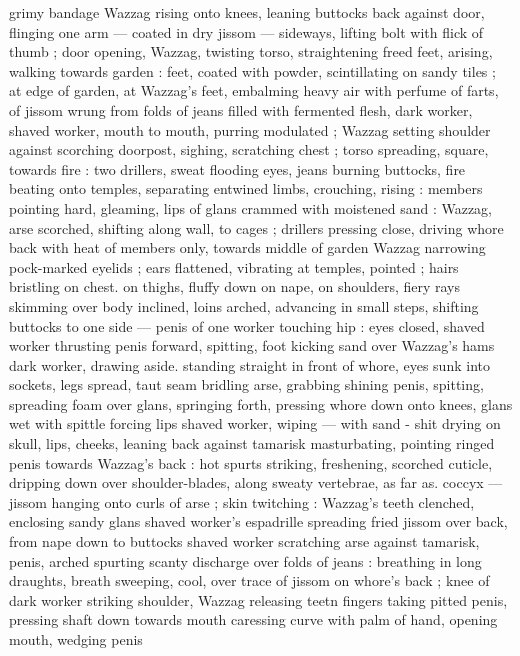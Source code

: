 grimy bandage {\semislash} Wazzag rising onto knees, leaning buttocks back 
against door, flinging one arm --- coated in dry jissom --- sideways, 
lifting bolt with flick of thumb ; door opening, Wazzag, twisting torso, 
straightening freed feet, arising, walking towards garden : feet, 
coated with powder, scintillating on sandy tiles ; at edge of garden, 
at Wazzag's feet, embalming heavy air with perfume of farts, of 
jissom wrung from folds of jeans filled with fermented flesh, dark 
worker, shaved worker, mouth to mouth, purring modulated ; Wazzag 
setting shoulder against scorching doorpost, sighing, scratching 
chest ; torso spreading, square, towards fire : two drillers, sweat 
flooding eyes, jeans burning buttocks, fire beating onto temples, 
separating entwined limbs, crouching, rising : members pointing 
hard, gleaming, lips of glans crammed with moistened sand : 
Wazzag, arse scorched, shifting along wall, to cages ; drillers 
pressing close, driving whore back with heat of members only, 
towards middle of garden {\col} Wazzag narrowing pock-marked eyelids ; 
ears flattened, vibrating at temples, pointed ; hairs bristling on chest. 
on thighs, fluffy down on nape, on shoulders, fiery rays skimming 
over body inclined, loins arched, advancing in small steps, shifting 
buttocks to one side --- penis of one worker touching hip : eyes 
closed, shaved worker thrusting penis forward, spitting, foot kicking 
sand over Wazzag's hams {\col} dark worker, drawing aside. standing 
straight in front of whore, eyes sunk into sockets, legs spread, taut 
seam bridling arse, grabbing shining penis, spitting, spreading foam 
over glans, springing forth, pressing whore down onto knees, glans 
wet with spittle forcing lips {\col} shaved worker, wiping --- with sand - 
shit drying on skull, lips, cheeks, leaning back against tamarisk 
masturbating, pointing ringed penis towards Wazzag's back : hot 
spurts striking, freshening, scorched cuticle, dripping down over 
shoulder-blades, along sweaty vertebrae, as far as. coccyx --- jissom 
hanging onto curls of arse ; skin twitching : Wazzag's teeth 
clenched, enclosing sandy glans {\col} shaved worker's espadrille 
spreading fried jissom over back, from nape down to buttocks 
shaved worker scratching arse against tamarisk, penis, arched 
spurting scanty discharge over folds of jeans : breathing in long 
draughts, breath sweeping, cool, over trace of jissom on whore's 
back ; knee of dark worker striking shoulder, Wazzag releasing teetn 
fingers taking pitted penis, pressing shaft down towards mouth 
caressing curve with palm of hand, opening mouth, wedging penis 
